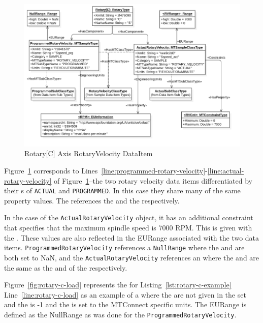 \begin{figure}[ht]
    \centering
    \includegraphics[width=1.0\textwidth]{diagrams/mtconnect-mapping/rotary-c-rotary-velocity.png}
    \caption{Rotary[C] Axis RotaryVelocity DataItem}
    \label{fig:rotary-c-rotary-velocity}
\end{figure}

Figure~\ref{fig:rotary-c-rotary-velocity} corresponds to Lines~\ref{line:programmed-rotary-velocity}-\ref{line:actual-rotary-velocity} of Figure~\ref{fig:rotary-c-rotary-velocity}--the two rotary velocity data items differentiated by their s of \texttt{ACTUAL} and \texttt{PROGRAMMED}. In this case they share many of the same property values. The  references the  and the  respectively.

In the case of the \texttt{ActualRotaryVelocity} object, it has an additional constraint that specifies that the maximum spindle speed is 7000 RPM. This is given with the . These values are also reflected in the EURange associated with the two data items. \texttt{ProgrammedRotaryVelocity} references a \texttt{NullRange} where the  and  are both set to NaN, and the \texttt{ActualRotaryVelocity} references an  where the  and  are the same as the  and  of the  respectively. 

\FloatBarrier

Figure~\ref{fig:rotary-c-load} represents the   for Listing~\ref{lst:rotary-c-example} Line~\ref{line:rotary-c-load} as an example of a  where the  are not given in the  set and the  is -1 and the  is set to the MTConnect specific units. The EURange is defined as the NullRange as was done for the \texttt{ProgrammedRotaryVelocity}.

